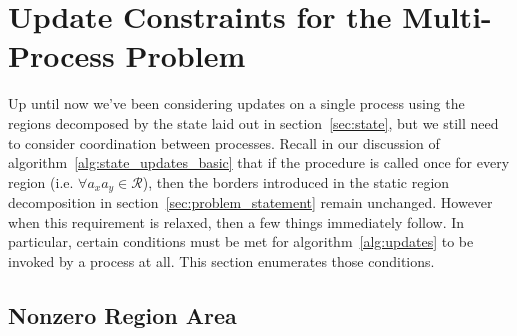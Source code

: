 


\section{Update Constraints for the Multi-Process Problem}

Up until now we've been considering updates on a single process using the regions decomposed by the state
laid out in section~\ref{sec:state}, but we still need to consider coordination between processes.
Recall in our discussion of algorithm~\ref{alg:state_updates_basic} that if the procedure is called
once for every region (i.e. $\forall a_xa_y \in \mathcal{R}$), then the borders introduced in the static
region decomposition in section~\ref{sec:problem_statement} remain unchanged.  However when this requirement
is relaxed, then a few things immediately follow.  In
particular, certain conditions must be met for algorithm~\ref{alg:updates} to be invoked by a process at all.  This
section enumerates those conditions.

\subsection{Nonzero Region Area}

